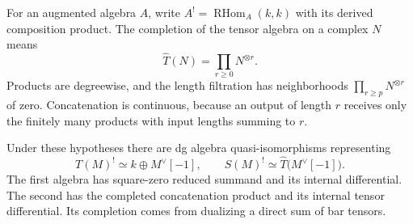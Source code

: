 For an augmented algebra $A$, write $A^!=\operatorname{RHom}_A(k,k)$ with its derived composition product.
The completion of the tensor algebra on a complex $N$ means
\[
 \widehat T(N)=\prod_{r\ge0}N^{\otimes r}.
\]
Products are degreewise, and the length filtration has neighborhoods $\prod_{r\ge p}N^{\otimes r}$ of zero.
Concatenation is continuous, because an output of length $r$ receives only the finitely many products with input lengths summing to $r$.

\begin{theorem}\label{cbc:free:duality}
Under these hypotheses there are dg algebra quasi-isomorphisms representing
\[
 T(M)^!\simeq k\oplus M^\vee[-1],\qquad
 S(M)^!\simeq\widehat T\bigl(M^\vee[-1]\bigr).
\]
The first algebra has square-zero reduced summand and its internal differential.
The second has the completed concatenation product and its internal tensor differential.
Its completion comes from dualizing a direct sum of bar tensors.
\end{theorem}
